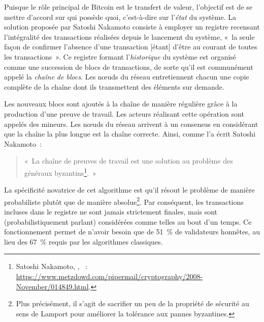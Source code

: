 Puisque le rôle principal de Bitcoin est le transfert de valeur, l'objectif est de se mettre d'accord sur qui possède quoi, c'est-à-dire sur l'\emph{état} du système. La solution proposée par Satoshi Nakamoto consiste à employer un registre recensant l'intégralité des transactions réalisées depuis le lancement du système, «~la seule façon de confirmer l'absence d'une transaction [étant] d'être au courant de toutes les transactions~». Ce registre formant l'\emph{historique} du système est organisé comme une succession de blocs de transactions, de sorte qu'il est communément appelé la \emph{chaîne de blocs}. Les nœuds du réseau entretiennent chacun une copie complète de la chaîne dont ils transmettent des éléments sur demande.

Les nouveaux blocs sont ajoutés à la chaîne de manière régulière grâce à la production d'une preuve de travail. Les acteurs réalisant cette opération sont appelés des mineurs. Les nœuds du réseau arrivent à un consensus en considérant que la chaîne la plus longue est la chaîne correcte. Ainsi, comme l'a écrit Satoshi Nakamoto~:

\vspace{-1em}
\begin{quote}
«~La chaîne de preuves de travail est une solution au problème des généraux byzantins\footnote{Satoshi Nakamoto, , ~: \url{https://www.metzdowd.com/pipermail/cryptography/2008-November/014849.html}.}.~»
\end{quote}

La spécificité novatrice de cet algorithme est qu'il résout le problème de manière probabiliste plutôt que de manière absolue\footnote{Plus précisément, il s'agit de sacrifier un peu de la propriété de sécurité au sens de Lamport pour améliorer la tolérance aux pannes byzantines.}. Par conséquent, les transactions incluses dans le registre ne sont jamais strictement finales, mais sont (probabilistiquement parlant) considérées comme telles au bout d'un temps. Ce fonctionnement permet de n'avoir besoin que de 51~\% de validateurs honnêtes, au lieu des 67~\% requis par les algorithmes classiques.


